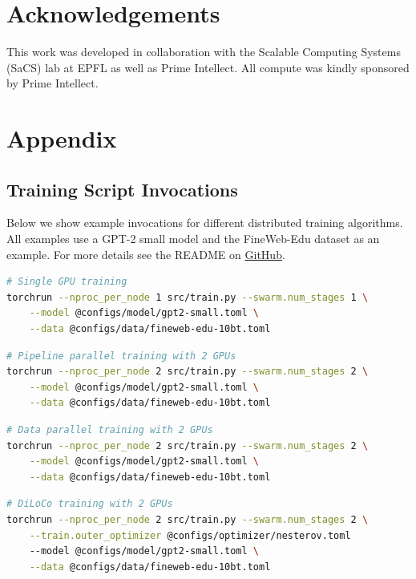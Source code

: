 \documentclass{article}
\newcommand{\github}{\href{https://github.com/mikasenghaas/diloco-swarm}{GitHub}}
\begin{document}
\section*{Acknowledgements}
\label{sec:acknowledgements}

This work was developed in collaboration with the Scalable Computing Systems
(SaCS) lab at EPFL as well as Prime Intellect. All compute was kindly sponsored
by Prime Intellect.




\newpage
\appendix
\onecolumn

\section{Appendix}


\subsection{Training Script Invocations}

Below we show example invocations for different distributed training algorithms.
All examples use a GPT-2 small model and the FineWeb-Edu dataset as an example.
For more details see the README on \github.

\begin{lstlisting}[language=bash]
# Single GPU training
torchrun --nproc_per_node 1 src/train.py --swarm.num_stages 1 \
    --model @configs/model/gpt2-small.toml \
    --data @configs/data/fineweb-edu-10bt.toml
\end{lstlisting}

\begin{lstlisting}[language=bash]
# Pipeline parallel training with 2 GPUs
torchrun --nproc_per_node 2 src/train.py --swarm.num_stages 2 \
    --model @configs/model/gpt2-small.toml \
    --data @configs/data/fineweb-edu-10bt.toml
\end{lstlisting}

\begin{lstlisting}[language=bash]
# Data parallel training with 2 GPUs
torchrun --nproc_per_node 2 src/train.py --swarm.num_stages 2 \
    --model @configs/model/gpt2-small.toml \
    --data @configs/data/fineweb-edu-10bt.toml
\end{lstlisting}

\begin{lstlisting}[language=bash]
# DiLoCo training with 2 GPUs
torchrun --nproc_per_node 2 src/train.py --swarm.num_stages 2 \
    --train.outer_optimizer @configs/optimizer/nesterov.toml
    --model @configs/model/gpt2-small.toml \
    --data @configs/data/fineweb-edu-10bt.toml
\end{lstlisting}
\end{document}
